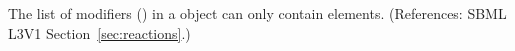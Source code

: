The list of modifiers (\ListOfModifiers) in a \Reaction object can only
contain \ModifierSpeciesReference elements.  (References: SBML L3V1
Section~\ref{sec:reactions}.)
